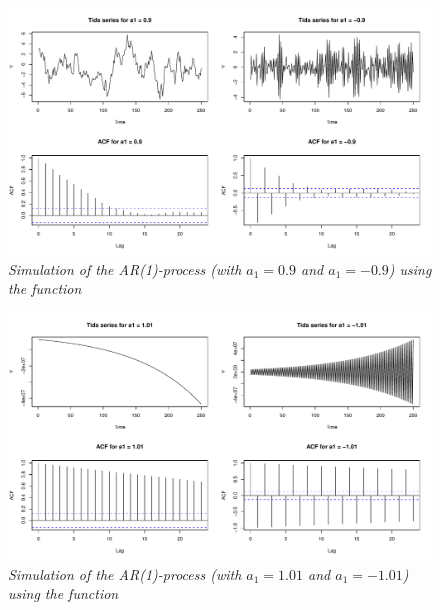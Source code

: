 \begin{figure}
    \centering
    \includegraphics[width=140mm]{ar1-filter-2.pdf}
    \caption{\textit{Simulation of the AR(1)-process (with $a_1=0.9$ and $a_1=-0.9$) using the  function}}
    \label{fig:ar1-filter-2}
\end{figure}

\begin{figure}
    \centering
    \includegraphics[width=140mm]{ar1-filter-3.pdf}
    \caption{\textit{Simulation of the AR(1)-process (with $a_1=1.01$ and $a_1=-1.01$) using the  function}}
    \label{fig:ar1-filter-3}
\end{figure}

